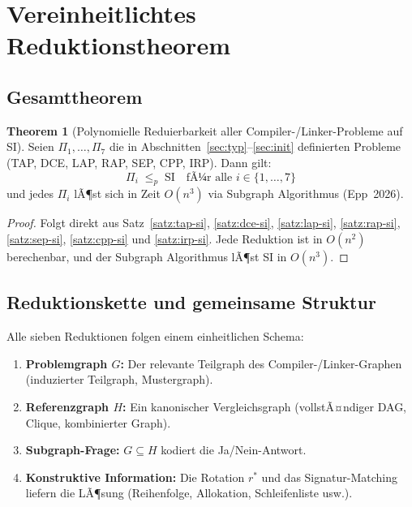 ﻿\documentclass[a4paper,12pt]{article}
\theoremstyle{definition}
\newtheorem{theorem}{Theorem}
\begin{document}
\section{Vereinheitlichtes Reduktionstheorem}

\subsection{Gesamttheorem}

\begin{theorem}[Polynomielle Reduierbarkeit aller Compiler-/Linker-Probleme auf SI]
\label{thm:gesamt}
Seien $\Pi_1, \ldots, \Pi_7$ die in Abschnitten~\ref{sec:typ}--\ref{sec:init} definierten Probleme (TAP, DCE, LAP, RAP, SEP, CPP, IRP). Dann gilt:
\[
\Pi_i \;\leq_p\; \text{SI} \quad \text{fÃ¼r alle } i \in \{1, \ldots, 7\}
\]
und jedes $\Pi_i$ lÃ¶st sich in Zeit $O(n^3)$ via Subgraph Algorithmus (Epp~2026).
\end{theorem}

\begin{proof}
Folgt direkt aus Satz~\ref{satz:tap-si}, \ref{satz:dce-si}, \ref{satz:lap-si}, \ref{satz:rap-si}, \ref{satz:sep-si}, \ref{satz:cpp-si} und \ref{satz:irp-si}. Jede Reduktion ist in $O(n^2)$ berechenbar, und der Subgraph Algorithmus lÃ¶st SI in $O(n^3)$.
\end{proof}

\subsection{Reduktionskette und gemeinsame Struktur}

Alle sieben Reduktionen folgen einem einheitlichen Schema:

\begin{enumerate}
    \item \textbf{Problemgraph $G$:} Der relevante Teilgraph des Compiler-/Linker-Graphen (induzierter Teilgraph, Mustergraph).
    \item \textbf{Referenzgraph $H$:} Ein kanonischer Vergleichsgraph (vollstÃ¤ndiger DAG, Clique, kombinierter Graph).
    \item \textbf{Subgraph-Frage:} $G \subseteq H$ kodiert die Ja/Nein-Antwort.
    \item \textbf{Konstruktive Information:} Die Rotation $r^*$ und das Signatur-Matching liefern die LÃ¶sung (Reihenfolge, Allokation, Schleifenliste usw.).
\end{enumerate}
\end{document}
